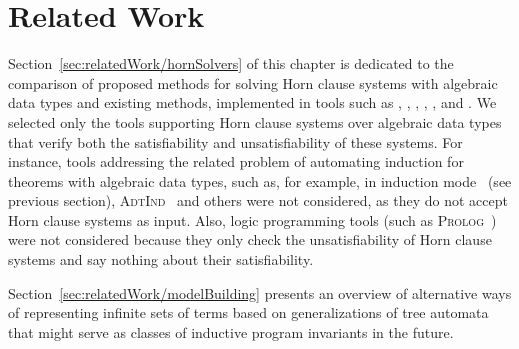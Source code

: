 \chapter{Related Work}\label{ch:relatedWork}

Section~\cref{sec:relatedWork/hornSolvers} of this chapter is dedicated to the comparison of proposed methods for solving Horn clause systems with algebraic data types and existing methods, implemented in tools such as \spacer{}, \racer{}, \eldarica{}, \vericat{}, \hoice{}, and \rchc{}. We selected only the tools supporting Horn clause systems over algebraic data types that verify both the satisfiability and unsatisfiability of these systems. For instance, tools addressing the related problem of automating induction for theorems with algebraic data types, such as, for example, \cvc{} in induction mode~\cite{reynolds2015induction} (see previous section), \textsc{AdtInd}~\cite{10.1007/978-3-030-30048-7_35} and others were not considered, as they do not accept Horn clause systems as input. Also, logic programming tools (such as \textsc{Prolog}~\cite{ClocksinMellish03}) were not considered because they only check the unsatisfiability of Horn clause systems and say nothing about their satisfiability.



Section~\cref{sec:relatedWork/modelBuilding} presents an overview of alternative ways of representing infinite sets of terms based on generalizations of tree automata that might serve as classes of inductive program invariants in the future.

